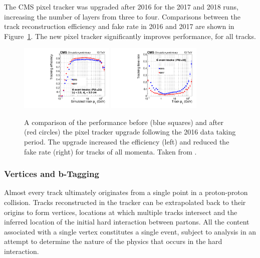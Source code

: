   The CMS pixel tracker was upgraded after 2016 for the 2017 and 2018 runs, increasing the number of layers from three to four.
  Comparisons between the track reconstruction efficiency and fake rate in 2016 and 2017 are shown in Figure~\ref{fig:16vs17}.
  The new pixel tracker significantly improves performance, for all tracks.

  \begin{figure}[h!]
    \centering
    \includegraphics[width=0.4\textwidth]{figures/tracking_16vs17_eff.pdf}
    \includegraphics[width=0.4\textwidth]{figures/tracking_16vs17_fake.pdf}
    \caption[Comparison of tracker performance in 2016 and after the upgrade to the pixel tracker.]{
      A comparison of the performance before (blue squares) and after (red circles) the pixel tracker upgrade following the 2016 data taking period.
      The upgrade increased the efficiency (left) and reduced the fake rate (right) for tracks of all momenta.
      Taken from \cite{cmstrackingperformance}.}
    \label{fig:16vs17}
  \end{figure}  

    \subsubsection{Vertices and b-Tagging} \label{sec:btagging}

    Almost every track ultimately originates from a single point in a proton-proton collision.
    Tracks reconstructed in the tracker can be extrapolated back to their origins to form vertices, locations at which multiple tracks intersect and the inferred location of the initial hard interaction between partons.
    All the content associated with a single vertex constitutes a single event, subject to analysis in an attempt to determine the nature of the physics that occurs in the hard interaction.


